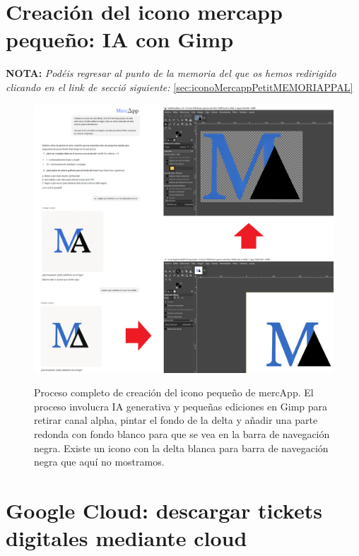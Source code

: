 \documentclass[a4paper,12pt]{report}
\begin{document}
	\pagebreak
	\section{Creación del icono mercapp pequeño: IA con Gimp}
	\label{sec:edicionMercAppIconoPequenyo}
	
	\noindent \textbf{NOTA:} \textit{Podéis regresar al punto de la memoria del que os hemos redirigido clicando en el link de secció siguiente:} \ref{sec:iconoMercappPetitMEMORIAPPAL}
	
	\FloatBarrier
	\setlength{\belowcaptionskip}{3pt}
	\begin{figure}[H]
		\centering
		\caption{Proceso completo de creación del icono pequeño de mercApp. El proceso involucra IA generativa y pequeñas ediciones en Gimp para retirar canal alpha, pintar el fondo de la delta y añadir una parte redonda con fondo blanco para que se vea en la barra de navegación negra. Existe un icono con la delta blanca para barra de navegación negra que aquí no mostramos.}
		\includegraphics[width=1\linewidth]{img/edicionMercAppIconoPequenyo.png}
		\label{fig:edicionMercAppIconoPequenyo}
	\end{figure}
	\FloatBarrier
		

	
	
	\section{Google Cloud: descargar tickets digitales mediante cloud}
	\label{sec:googleCloud}
	
\end{document}
